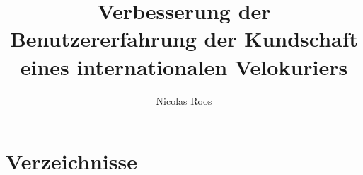





\title{Verbesserung der Benutzererfahrung der Kundschaft eines internationalen Velokuriers} %
\author{Nicolas Roos}


\setcounter{page}{1}
%



\tableofcontents
\newpage





%


\chapter{Verzeichnisse}
\label{sec:Verzeichnisse}

\listoffigures
{}
\listoftables
{}
%

\lstlistoflistings
{}




